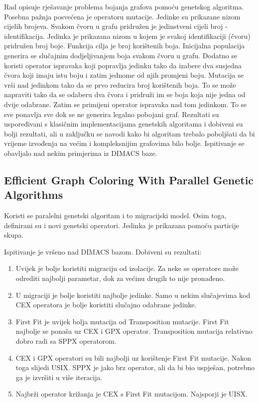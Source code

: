 \documentclass[times, utf8, diplomski, numeric]{fer}
\begin{document}
Rad opisuje rješavanje problema bojanja grafova pomoću genetskog algoritma.
Posebna pažnja posvećena je operatoru mutacije.
Jedinke su prikazane nizom cijelih brojeva. Svakom čvoru u grafu pridružen je jedinstveni cijeli broj - identifikacija.
Jedinka je prikazana nizom u kojem je svakoj identifikaciji (čvoru)
pridružen broj boje. Funkcija cilja je broj korištenih boja.
Inicijalna populacija generira se slučajnim dodjeljivanjem
boja svakom čvoru u grafu.
Dodatno se koristi operator ispravaka koji popravlja jedinku tako da izabere dva susjedna čvora koji imaju istu boju i zatim jednome od njih promjeni boju.
Mutacija se vrši nad jedinkom tako da se prvo reducira broj korištenih boja. To se može napraviti tako da se odaberu dva čvora i pridruži im se boja koja nije jedna od dvije odabrane.
Zatim se primijeni operator ispravaka nad tom jedinkom. To se sve ponavlja sve dok se ne generira legalno pobojani graf.
Rezultati su uspoređivani s klasičnim implementacijama genetskih algoritama i
dobiveni su bolji rezultati, ali u zaključku se navodi kako bi algoritam trebalo poboljšati da bi vrijeme
izvođenja na većim i kompleksnijim grafovima bilo bolje.
Ispitivanje se obavljalo nad nekim primjerima iz DIMACS baze.

\subsection*{Efficient Graph Coloring With Parallel Genetic Algorithms \cite{lit2}}

Koristi se paralelni genetski algoritam i to migracijski model. Osim toga,
definirani su i novi genetski operatori. Jedinka je prikazana pomoću 
particije skupa. 

Ispitivanje je vršeno nad DIMACS bazom.
Dobiveni su rezultati:
\begin{enumerate}
\item Uvijek je bolje koristiti migraciju od izolacije. Za neke se operatore može odrediti najbolji parametar, dok za većinu drugih to nije pronađeno.

\item U migraciji je bolje koristiti najbolje jedinke. Samo u nekim slučajevima kod CEX operatora je bolje koristiti slučajno odabrane jedinke.

\item First Fit je uvijek bolja mutacija od Transposition mutacije. First Fit najbolje se ponaša uz CEX i GPX operator. Transposition mutacija relativno dobro radi sa SPPX operatorom.

\item CEX i GPX operatori su bili najbolji uz korištenje First Fit mutacije.
Nakon toga slijedi USIX. SPPX je jako brz operator, ali da bi bio uspješan,
potrebno ga je izvršiti u više iteracija.

\item Najbrži operator križanja je CEX s First Fit mutacijom. Najsporji je UISX.
\end{enumerate}
\end{document}
